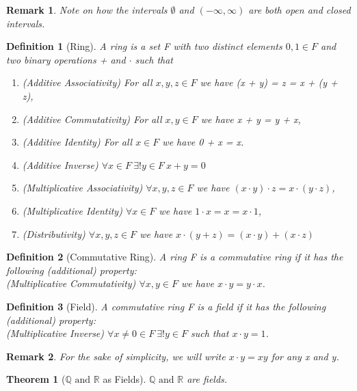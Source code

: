 \documentclass[11pt, oneside]{book}
\theoremstyle{break}
\newtheorem{thm}{Theorem}[section]
\newtheorem*{remark}{Remark}
\newtheorem{defn}{Definition}[section]
\newcommand{\bb}[1]{\mathbb{#1}}		%
\begin{document}
\begin{remark}
	Note on how the intervals $\emptyset$ and $(-\infty, \infty)$ are both open and closed intervals.
\end{remark}

\begin{defn}[Ring]
	A ring is a set F with two distinct elements $0, 1 \in F$ and two binary operations + and $\cdot$ such that
	\begin{enumerate}
		\item (Additive Associativity) For all $x, y, z \in F$ we have (x + y) = z = x + (y + z),
		\item (Additive Commutativity) For all $x, y \in F$ we have x + y = y + x,
		\item (Additive Identity) For all $x \in F$ we have 0 + x = x.
		\item (Additive Inverse) $\forall x \in F \> \exists! y \in F \> x + y = 0$
		\item (Multiplicative Associativity) $\forall x, y, z \in F$ we have $(x \cdot y) \cdot z = x \cdot (y \cdot z)$,
		\item (Multiplicative Identity) $\forall x \in F$ we have $1 \cdot x = x = x \cdot 1$,
		\item (Distributivity) $\forall x, y, z \in F$ we have $x \cdot (y + z) = (x \cdot y) + (x \cdot z)$
	\end{enumerate}
\end{defn}

\begin{defn}[Commutative Ring]
	A ring F is a commutative ring if it has the following (additional) property: \\
	(Multiplicative Commutativity) $\forall x, y \in F$ we have $x \cdot y = y \cdot x$.
\end{defn}

\begin{defn}[Field]
	A commutative ring F is a field if it has the following (additional) property: \\
	(Multiplicative Inverse) $\forall x \neq 0 \in F \> \exists! y \in F$ such that $x \cdot y = 1$.
\end{defn}

\begin{remark}
	For the sake of simplicity, we will write $x \cdot y = xy$ for any x and y.
\end{remark}

\begin{thm}[$\bb{Q} \text{ and } \bb{R}$ as Fields]
	$\bb{Q} \text{ and } \bb{R}$ are fields.
\end{thm}
\end{document}
